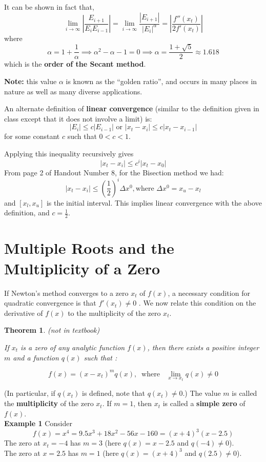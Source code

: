 \documentclass [titlepage,12pt,letter] {article}
\newtheorem{theorem}{Theorem}
\begin{document}
It can be shown in fact that, 
\begin{equation} 
\lim_{i \rightarrow \infty} \left| \frac{E_{i+1}}{E_iE_{i-1}}\right| = \lim_{i \rightarrow \infty} \frac{|E_{i+1}|}{|E_i|^{\alpha}} = \left| \frac{f''(x_t)}{2f'(x_t)} \right|
\end{equation}
where 
\[
\alpha = 1 + \frac{1}{\alpha} \implies \alpha^2 - \alpha -1 = 0 \implies \alpha = \frac{1+\sqrt{5}}{2} \approx 1.618 
\]
\noindent 
which is the {\bf order of the Secant method}. 

\noindent 
{\bf Note:} this value $\alpha$ is known as the ``golden ratio'', and occurs in many places in nature as well as many diverse applications. 


An alternate definition of {\bf linear convergence} (similar to the definition given in class except that it does not involve a limit) is: 
\[
|E_i| \leq c|E_{i-1}| \mbox{ or } |x_t - x_i| \leq c |x_t - x_{i-1}|
\]
\noindent 
for some constant $c$ such that $0 < c < 1$. 

Applying this inequality recursively gives 
\[
|x_t - x_i| \leq c^{i} |x_t-x_0|
\]
\noindent 
From page 2 of Handout Number 8, for the Bisection method we had: 
\[
|x_t - x_i| \leq \left( \frac{1}{2}\right)^i \Delta x^0,\mbox{where } \Delta x^{0} = x_u - x_l 
\]
\noindent 
and $[x_l, x_u]$ is the initial interval. This implies linear convergence with the above definition, and $c=\frac{1}{2}$. 
 
\section{Multiple Roots and the Multiplicity of a Zero} 

If Newton's method converges to a zero $x_t$ of $f(x)$, a necessary
condition for quadratic convergence is that $f'(x_t) \neq 0$ . We now
relate this condition on the derivative of $f(x)$ to the multiplicity
of the zero $x_t$.
\vspace{1cm} 

\noindent 
\begin{theorem} (not in textbook)

If $x_t$ is a zero of any analytic function $f(x)$, then there exists a
positive integer $m$ and a function $q(x)$ such that : 

\[
f(x)=(x - x_t)^mq(x),\;\;\mbox{where } \;\; \lim_{x \rightarrow x_t} q(x) \neq 0
\] 

\end{theorem}

(In particular, if $q(x_t)$ is defined, note that $q(x_t ) \neq 0$.) The
value $m$ is called the {\bf multiplicity} of the zero $x_t$. If $m=1$, then 
$x_t$ is called a {\bf simple zero} of $f(x)$. 
\\
{\bf Example 1} Consider 
\[ 
f(x) = x^4 = 9.5 x^3 + 18 x^2 - 56x - 160 = (x+4)^3(x-2.5) 
\]
\noindent 
The zero at $x_t = -4$ has $m=3$ (here $q(x)=x-2.5$ and $q(-4) \neq 0$). \\ 
\noindent 
The zero at $x =2.5$ has $m=1$ (here $q(x)=(x+4)^3$ and $q(2.5) \neq 0$). \\ 
\end{document}

